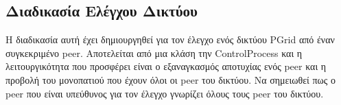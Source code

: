 \subsection{Διαδικασία Ελέγχου Δικτύου}

Η διαδικασία αυτή έχει δημιουργηθεί για τον έλεγχο ενός δικτύου 
PGrid από έναν συγκεκριμένο peer. Αποτελείται από μια κλάση την 
ControlProcess και η λειτουργικότητα που προσφέρει είναι ο εξαναγκασμός 
αποτυχίας ενός peer και η προβολή του μονοπατιού που έχουν όλοι οι peer 
του δικτύου. Να σημειωθεί πως ο peer που είναι υπεύθυνος για τον έλεγχο 
γνωρίζει όλους τους peer του δικτύου.
